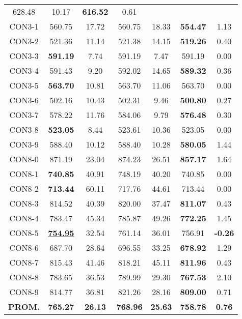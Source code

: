 \begin{table}[ht]
\begin{tabular}{c c c c c c c}
628.48 & 10.17 & \bf{616.52} & 
0.61\\CON3-1 & 560.75 & 17.72 & 
560.75 & 18.33 & \bf{554.47} & 
1.13\\CON3-2 & 521.36 & 11.14 & 
521.38 & 14.15 & \bf{519.26} & 
0.40\\CON3-3 & \bf{591.19} & 7.74 & 
591.19 & 7.47 & 591.19 & 0.00\\
CON3-4 & 591.43 & 9.20 & 
592.02 & 14.65 & \bf{589.32} & 
0.36\\CON3-5 & \bf{563.70} & 10.81 & 
563.70 & 11.06 & 563.70 & 0.00\\
CON3-6 & 502.16 & 10.43 & 
502.31 & 9.46 & \bf{500.80} & 
0.27\\CON3-7 & 578.22 & 11.76 & 
584.06 & 9.79 & \bf{576.48} & 
0.30\\CON3-8 & \bf{523.05} & 8.44 & 
523.61 & 10.36 & 523.05 & 0.00\\
CON3-9 & 588.40 & 10.12 & 
588.40 & 10.28 & \bf{580.05} & 
1.44\\CON8-0 & 871.19 & 23.04 & 
874.23 & 26.51 & \bf{857.17} & 
1.64\\CON8-1 & \bf{740.85} & 40.91 & 
748.19 & 40.20 & 740.85 & 0.00\\
CON8-2 & \bf{713.44} & 60.11 & 
717.76 & 44.61 & 713.44 & 0.00\\
CON8-3 & 814.52 & 40.39 & 
820.00 & 37.47 & \bf{811.07} & 
0.43\\CON8-4 & 783.47 & 45.34 & 
785.87 & 49.26 & \bf{772.25} & 
1.45\\CON8-5 & \bf{\underline{754.95}} & 32.54 & 
761.14 & 36.01 & 756.91 & 
\bf{-0.26}\\CON8-6 & 687.70 & 28.64 & 
696.55 & 33.25 & \bf{678.92} & 
1.29\\CON8-7 & 815.43 & 41.46 & 
818.21 & 45.11 & \bf{811.96} & 
0.43\\CON8-8 & 783.65 & 36.53 & 
789.99 & 29.30 & \bf{767.53} & 
2.10\\CON8-9 & 814.77 & 36.81 & 
821.26 & 28.16 & \bf{809.00} & 
0.71\\\bf{PROM.} & 
\bf{765.27} & \bf{26.13} & \bf{768.96} & \bf{25.63} & \bf{758.78} & \bf{0.76}\\[1ex]\hline
\end{tabular}
\label{table:nonlin}
\end{table} \clearpage
